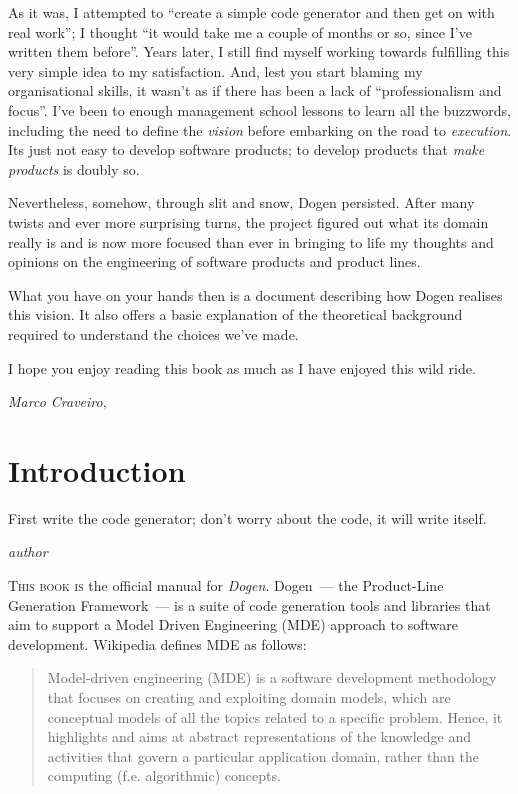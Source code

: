 \documentclass{book}
\begin{document}
As it was, I attempted to ``create a simple code generator and then
get on with real work''; I thought ``it would take me a couple of
months or so, since I've written them before''. Years later, I still
find myself working towards fulfilling this very simple idea to my
satisfaction. And, lest you start blaming my organisational skills, it
wasn't as if there has been a lack of ``professionalism and
focus''. I've been to enough management school lessons to learn all
the buzzwords, including the need to define the \emph{vision} before
embarking on the road to \emph{execution}. Its just not easy to
develop software products; to develop products that \emph{make
  products} is doubly so.

Nevertheless, somehow, through slit and snow, Dogen persisted. After
many twists and ever more surprising turns, the project figured out
what its domain really is and is now more focused than ever in
bringing to life my thoughts and opinions on the engineering of
software products and product lines.

What you have on your hands then is a document describing how Dogen
realises this vision. It also offers a basic explanation of the
theoretical background required to understand the choices we've made.

I hope you enjoy reading this book as much as I have enjoyed this wild
ride.

\begin{flushright}\emph{Marco Craveiro}, \the\year\end{flushright}

\chapter*{Introduction}

\epigraph{First write the code generator; don't worry about the code,
  it will write itself.}{\emph{author}}

\lettrine{T}{his book is} the official manual for
\emph{Dogen}. Dogen~--- the Product-Line Generation Framework~--- is a
suite of code generation tools and libraries that aim to support a
Model Driven Engineering (MDE) approach to software
development. Wikipedia defines MDE as follows:

\begin{quote}
Model-driven engineering (MDE) is a software development methodology
that focuses on creating and exploiting domain models, which are
conceptual models of all the topics related to a specific
problem. Hence, it highlights and aims at abstract representations of
the knowledge and activities that govern a particular application
domain, rather than the computing (f.e. algorithmic) concepts.
\end{quote}
\end{document}
